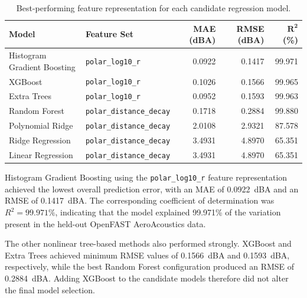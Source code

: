 \documentclass[11pt]{article}
\begin{document}
\begin{table}[htbp]
    \centering
    \caption{Best-performing feature representation for each candidate
    regression model.}
    \label{tab:surrogate-best-models}

    \begin{tabularx}{\textwidth}{
        >{\raggedright\arraybackslash}X
        l
        r
        r
        r
    }
        \toprule
        \textbf{Model}
        & \textbf{Feature Set}
        & \textbf{MAE (dBA)}
        & \textbf{RMSE (dBA)}
        & $\mathbf{R^2}$ (\%) \\
        \midrule

        Histogram Gradient Boosting
        & \texttt{polar\_log10\_r}
        & 0.0922 & 0.1417 & 99.971 \\

        XGBoost
        & \texttt{polar\_log10\_r}
        & 0.1026 & 0.1566 & 99.965 \\

        Extra Trees
        & \texttt{polar\_log10\_r}
        & 0.0952 & 0.1593 & 99.963 \\

        Random Forest
        & \texttt{polar\_distance\_decay}
        & 0.1718 & 0.2884 & 99.880 \\

        Polynomial Ridge
        & \texttt{polar\_distance\_decay}
        & 2.0108 & 2.9321 & 87.578 \\

        Ridge Regression
        & \texttt{polar\_distance\_decay}
        & 3.4931 & 4.8970 & 65.351 \\

        Linear Regression
        & \texttt{polar\_distance\_decay}
        & 3.4931 & 4.8970 & 65.351 \\

        \bottomrule
    \end{tabularx}
\end{table}

Histogram Gradient Boosting using the \texttt{polar\_log10\_r} feature representation achieved the lowest overall prediction error, with an MAE of 0.0922~dBA and an RMSE of 0.1417~dBA. The corresponding coefficient of determination was $R^2=99.971\%$, indicating that the model explained 99.971\% of the variation present in the held-out OpenFAST AeroAcoustics data.

The other nonlinear tree-based methods also performed strongly. XGBoost and Extra Trees achieved minimum RMSE values of 0.1566~dBA and 0.1593~dBA, respectively, while the best Random Forest configuration produced an RMSE of 0.2884~dBA. Adding XGBoost to the candidate models therefore did not alter the final model selection.
\end{document}
